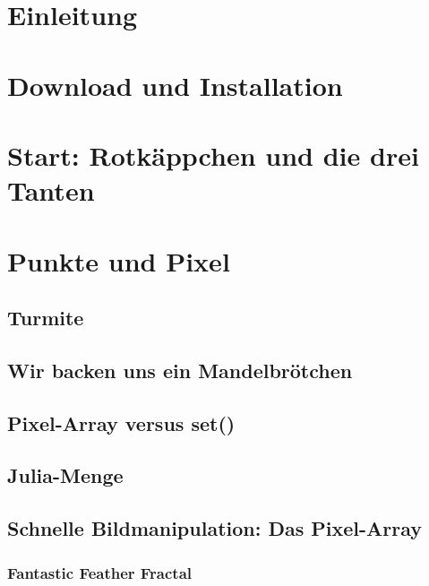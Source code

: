 \documentclass[10pt,german,]{book}
\date{}
\begin{document}
{
\hypersetup{linkcolor=black}
\setcounter{tocdepth}{2}
\tableofcontents
}
\chapter{Einleitung}\label{einleitung}

\chapter{Download und Installation}\label{download-und-installation}

\chapter{Start: Rotkäppchen und die drei
Tanten}\label{start-rotkuxe4ppchen-und-die-drei-tanten}

\chapter{Punkte und Pixel}\label{punkte-und-pixel}

\section{Turmite}\label{turmite}

\section{Wir backen uns ein
Mandelbrötchen}\label{wir-backen-uns-ein-mandelbruxf6tchen}

\section{Pixel-Array versus set()}\label{pixel-array-versus-set}

\section{Julia-Menge}\label{julia-menge}

\section{Schnelle Bildmanipulation: Das
Pixel-Array}\label{schnelle-bildmanipulation-das-pixel-array}

\subsection{Fantastic Feather Fractal}\label{fantastic-feather-fractal}
\end{document}
